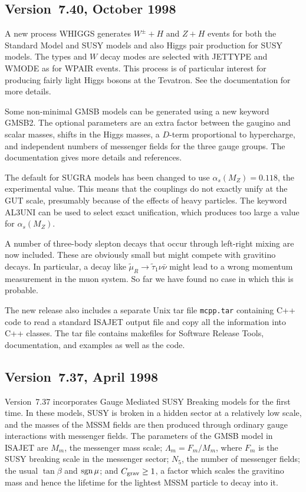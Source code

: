 \subsection{Version~7.40, October 1998}

        A new process WHIGGS generates $W^\pm+H$ and $Z+H$ events for
both the Standard Model and SUSY models and also Higgs pair production
for SUSY models. The types and $W$ decay modes are selected with
JETTYPE and WMODE as for WPAIR events. This process is of particular
interest for producing fairly light Higgs bosons at the Tevatron. See
the documentation for more details.

        Some non-minimal GMSB models can be generated using a new
keyword GMSB2. The optional parameters are an extra factor between the
gaugino and scalar masses, shifts in the Higgs masses, a $D$-term
proportional to hypercharge, and independent numbers of messenger
fields for the three gauge groups. The documentation gives more
details and references.

        The default for SUGRA models has been changed to use
$\alpha_s(M_Z)=0.118$, the experimental value. This means that the
couplings do not exactly unify at the GUT scale, presumably because of
the effects of heavy particles. The keyword AL3UNI can be used to
select exact unification, which produces too large a value for
$\alpha_s(M_Z)$.

        A number of three-body slepton decays that occur through
left-right mixing are now included. These are obviously small but
might compete with gravitino decays. In particular, a decay like
$\tilde\mu_R \to \tilde\tau_1 \nu\bar\nu$ might lead to a wrong
momentum measurement in the muon system. So far we have found no case
in which this is probable.

        The new release also includes a separate Unix tar file
\verb|mcpp.tar| containing C++ code to read a standard ISAJET output
file and copy all the information into C++ classes. The tar file
contains makefiles for Software Release Tools, documentation, and
examples as well as the code.

\subsection{Version~7.37, April 1998}

        Version~7.37 incorporates Gauge Mediated SUSY Breaking models
for the first time. In these models, SUSY is broken in a hidden sector
at a relatively low scale, and the masses of the MSSM fields are then
produced through ordinary gauge interactions with messenger fields.
The parameters of the GMSB model in ISAJET are $M_m$, the messenger
mass scale; $\Lambda_m = F_m/M_m$, where $F_m$ is the SUSY breaking
scale in the messenger sector; $N_5$, the number of messenger fields;
the usual $\tan\beta$ and $\mathop{\rm sgn}\mu$; and $C_{\rm grav} \ge 1$, a
factor which scales the gravitino mass and hence the lifetime for the
lightest MSSM particle to decay into it.

